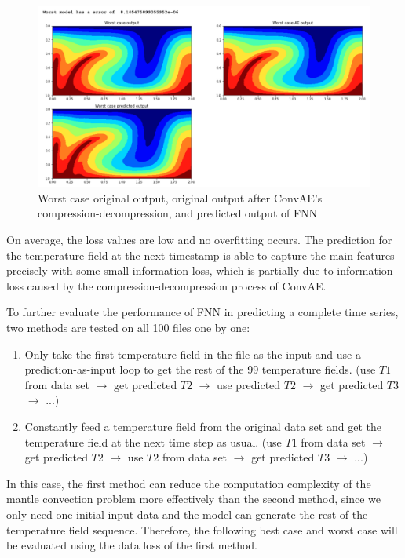 \begin{figure}[H]
    \caption{Worst case original output, original output after ConvAE's compression-decompression, and predicted output of FNN}
    \includegraphics[scale=0.5]{figures/mantle_convection_images/limited_dataset/FNN_Worst.png}
\end{figure}

On average, the loss values are low and no overfitting occurs. The prediction for the temperature field at the next timestamp is able to capture the main features precisely with some small information loss, which is partially due to information loss caused by the compression-decompression process of ConvAE.

To further evaluate the performance of FNN in predicting a complete time series, two methods are tested on all 100 files one by one: 

\begin{enumerate}
  \item Only take the first temperature field in the file as the input and use a prediction-as-input loop to get the rest of the 99 temperature fields. (use $T1$ from data set $\rightarrow$ get predicted $T2$ $\rightarrow$ use predicted $T2$ $\rightarrow$ get predicted $T3$ $\rightarrow$ ...)
  \item Constantly feed a temperature field from the original data set and get the temperature field at the next time step as usual. (use $T1$ from data set $\rightarrow$ get predicted $T2$ $\rightarrow$ use $T2$ from data set $\rightarrow$ get predicted $T3$ $\rightarrow$ ...)
\end{enumerate}

In this case, the first method can reduce the computation complexity of the mantle convection problem more effectively than the second method, since we only need one initial input data and the model can generate the rest of the temperature field sequence. Therefore, the following best case and worst case will be evaluated using the data loss of the first method.

